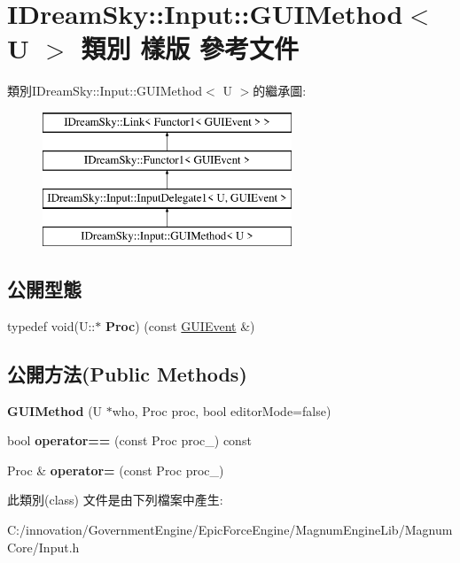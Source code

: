 \hypertarget{class_i_dream_sky_1_1_input_1_1_g_u_i_method}{}\section{I\+Dream\+Sky\+:\+:Input\+:\+:G\+U\+I\+Method$<$ U $>$ 類別 樣版 參考文件}
\label{class_i_dream_sky_1_1_input_1_1_g_u_i_method}
類別\+I\+Dream\+Sky\+:\+:Input\+:\+:G\+U\+I\+Method$<$ U $>$的繼承圖\+:\begin{figure}[H]
\begin{center}
\leavevmode
\includegraphics[height=4.000000cm]{class_i_dream_sky_1_1_input_1_1_g_u_i_method}
\end{center}
\end{figure}
\subsection*{公開型態}
\begin{DoxyCompactItemize}
\item 
typedef void(U\+::$\ast$ {\bfseries Proc}) (const \hyperlink{class_i_dream_sky_1_1_input_1_1_g_u_i_event}{G\+U\+I\+Event} \&)\hypertarget{class_i_dream_sky_1_1_input_1_1_g_u_i_method_a1304c94c4e77c025848966e661fde559}{}\label{class_i_dream_sky_1_1_input_1_1_g_u_i_method_a1304c94c4e77c025848966e661fde559}

\end{DoxyCompactItemize}
\subsection*{公開方法(Public Methods)}
\begin{DoxyCompactItemize}
\item 
{\bfseries G\+U\+I\+Method} (U $\ast$who, Proc proc, bool editor\+Mode=false)\hypertarget{class_i_dream_sky_1_1_input_1_1_g_u_i_method_a757c31014e476748f3357ec245fc3c85}{}\label{class_i_dream_sky_1_1_input_1_1_g_u_i_method_a757c31014e476748f3357ec245fc3c85}

\item 
bool {\bfseries operator==} (const Proc proc\+\_\+) const \hypertarget{class_i_dream_sky_1_1_input_1_1_g_u_i_method_a4289757e9787978686f567fdcdcbe267}{}\label{class_i_dream_sky_1_1_input_1_1_g_u_i_method_a4289757e9787978686f567fdcdcbe267}

\item 
Proc \& {\bfseries operator=} (const Proc proc\+\_\+)\hypertarget{class_i_dream_sky_1_1_input_1_1_g_u_i_method_a5f392caae9f622419abab0e79ed4fc58}{}\label{class_i_dream_sky_1_1_input_1_1_g_u_i_method_a5f392caae9f622419abab0e79ed4fc58}

\end{DoxyCompactItemize}


此類別(class) 文件是由下列檔案中產生\+:\begin{DoxyCompactItemize}
\item 
C\+:/innovation/\+Government\+Engine/\+Epic\+Force\+Engine/\+Magnum\+Engine\+Lib/\+Magnum\+Core/Input.\+h\end{DoxyCompactItemize}
